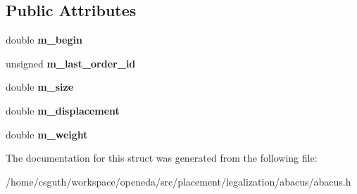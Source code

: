 \subsection*{Public Attributes}
\begin{DoxyCompactItemize}
\item 
\hypertarget{structophidian_1_1placement_1_1legalization_1_1abacus_1_1cluster_ad1a61c53b1b877abd6c8613a30ba913a}{double {\bfseries m\-\_\-begin}}\label{structophidian_1_1placement_1_1legalization_1_1abacus_1_1cluster_ad1a61c53b1b877abd6c8613a30ba913a}

\item 
\hypertarget{structophidian_1_1placement_1_1legalization_1_1abacus_1_1cluster_aac1c5e6781740dd892bf49df94a7df46}{unsigned {\bfseries m\-\_\-last\-\_\-order\-\_\-id}}\label{structophidian_1_1placement_1_1legalization_1_1abacus_1_1cluster_aac1c5e6781740dd892bf49df94a7df46}

\item 
\hypertarget{structophidian_1_1placement_1_1legalization_1_1abacus_1_1cluster_a2519ebfdc1124f12b397828b048870fa}{double {\bfseries m\-\_\-size}}\label{structophidian_1_1placement_1_1legalization_1_1abacus_1_1cluster_a2519ebfdc1124f12b397828b048870fa}

\item 
\hypertarget{structophidian_1_1placement_1_1legalization_1_1abacus_1_1cluster_a3d8ee85d5c2107afc3ac63bb9edc8cae}{double {\bfseries m\-\_\-displacement}}\label{structophidian_1_1placement_1_1legalization_1_1abacus_1_1cluster_a3d8ee85d5c2107afc3ac63bb9edc8cae}

\item 
\hypertarget{structophidian_1_1placement_1_1legalization_1_1abacus_1_1cluster_a8f0cd4cfbb004bc90575e9e5d2678fce}{double {\bfseries m\-\_\-weight}}\label{structophidian_1_1placement_1_1legalization_1_1abacus_1_1cluster_a8f0cd4cfbb004bc90575e9e5d2678fce}

\end{DoxyCompactItemize}


The documentation for this struct was generated from the following file\-:\begin{DoxyCompactItemize}
\item 
/home/csguth/workspace/openeda/src/placement/legalization/abacus/abacus.\-h\end{DoxyCompactItemize}
